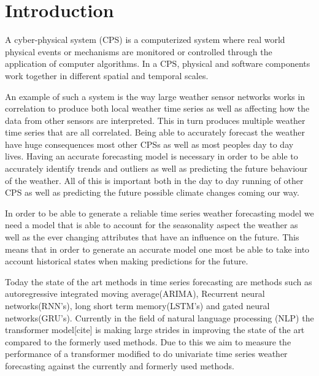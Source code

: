 \section{Introduction}
\label{sec:intro}
A cyber-physical system (CPS) is a computerized system where real world physical events or mechanisms are monitored or controlled through the application of computer algorithms.
In a CPS, physical and software components work together in different spatial and temporal scales.

An example of such a system is the way large weather sensor networks works in correlation to produce both local weather time series as well as affecting how the data from other sensors are interpreted. This in turn produces multiple weather time series that are all correlated. Being able to accurately forecast the weather have huge consequences most other CPSs as well as most peoples day to day lives. Having an accurate forecasting model is necessary in order to be able to accurately identify trends and outliers as well as predicting the future behaviour of the weather. All of this is important both in the day to day running of other CPS as well as predicting the future possible climate changes coming our way. 

In order to be able to generate a reliable time series weather forecasting model we need a model that is able to account for the seasonality aspect the weather as well as the ever changing attributes that have an influence on the future. This means that in order to generate an accurate model one most be able to take into account historical states when making predictions for the future. 

Today the state of the art methods in time series forecasting are methods such as autoregressive integrated moving average(ARIMA), Recurrent neural networks(RNN's), long short term memory(LSTM's) and gated neural networks(GRU's). Currently in the field of natural language processing (NLP) the transformer model[cite] is making large strides in improving the state of the art compared to the formerly used methods. Due to this we aim to measure the performance of a transformer modified to do univariate time series weather forecasting against the currently and formerly used methods. 

